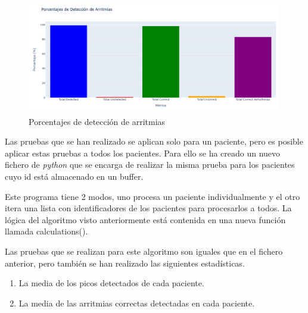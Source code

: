 \begin{figure}[h!]
	\centering
    \includegraphics[width=0.99\textwidth]{./Images/img_algoritmo/estadisticas_arritmias_2.png}
    \caption{Porcentajes de detección de arritmias}
    \label{fig:estadisticas_algoritmos_2}
\end{figure} 


Las pruebas que se han realizado se aplican solo para un paciente, pero es posible aplicar estas pruebas a todos los pacientes.
Para ello se ha creado un nuevo fichero de \textit{python} que se encarga de realizar la misma prueba para los pacientes cuyo id está
almacenado en un buffer.

Este programa tiene 2 modos, uno procesa un paciente individualmente y el otro itera una lista con identificadores de los pacientes para procesarlos a todos. La
lógica del algoritmo visto anteriormente está contenida en una nueva función llamada calculations().


Las pruebas que se realizan para este algoritmo son iguales que en el fichero anterior, pero también
se han realizado las siguientes estadísticas.

\begin{enumerate}
	\item La media de los picos detectados de cada paciente.
	\item La media de las arritmias correctas detectadas en cada paciente.
\end{enumerate} 